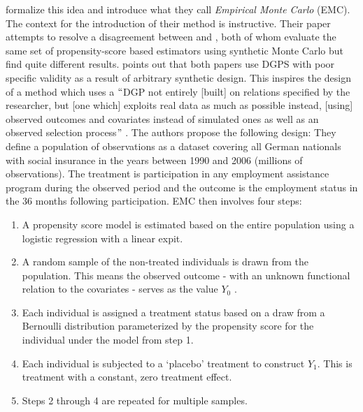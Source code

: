 \documentclass[../main.tex]{subfiles}
\begin{document}
\vspace{\baselineskip}
\textcite{Huber2013TheScore} formalize this idea and introduce what they call \textit{Empirical Monte Carlo }(EMC). The context for the introduction of their method is instructive. Their paper attempts to resolve a disagreement between \textcite{Frolich2004Finite-sampleEstimators} and \textcite{Busso2014NewEstimators}, both of whom evaluate the same set of propensity-score based estimators using synthetic Monte Carlo but find quite different results. \textcite{Huber2013TheScore} points out that both papers use DGPS with poor specific validity as a result of arbitrary synthetic design. This inspires the design of a method which uses a $``$DGP not entirely [built] on relations specified by the researcher, but [one which] exploits real data as much as possible instead, [using] observed outcomes and covariates instead of simulated ones as well as an observed selection process$"$ . The authors propose the following design: They define a population of observations as a dataset covering all German nationals with social insurance in the years between 1990 and 2006 (millions of observations). The treatment is participation in any employment assistance program during the observed period and the outcome is the employment status in the 36 months following participation. EMC then involves four steps: \par


\vspace{\baselineskip}
\begin{enumerate}
	\item A propensity score model is estimated based on the entire population using a logistic regression with a linear expit.\par

	\item A random sample of the non-treated individuals is drawn from the population. This means the observed outcome - with an unknown functional relation to the covariates - serves as the value  \( Y_{0} \) .\par

	\item Each individual is assigned a treatment status based on a draw from a Bernoulli distribution parameterized by the propensity score for the individual under the model from step 1.\par

	\item Each individual is subjected to a ‘placebo’ treatment to construct  \( Y_{1}. \) This is treatment with a constant, zero treatment effect.\par

	\item Steps 2 through 4 are repeated for multiple samples.
\end{enumerate}\par
\end{document}
